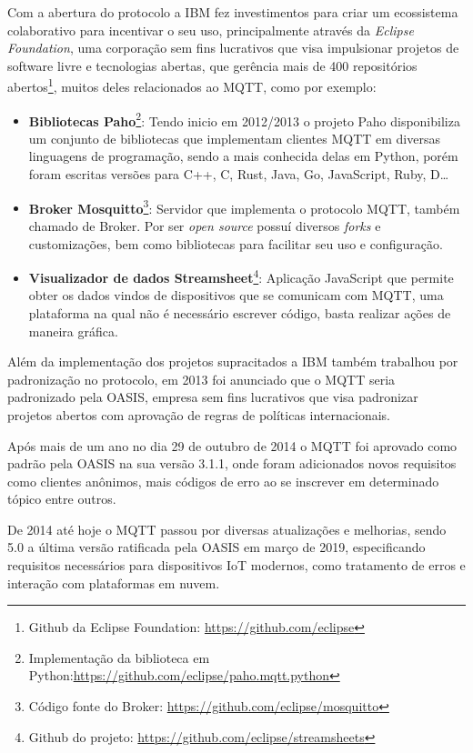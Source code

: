 \documentclass[12pt, a4paper]{article}
\begin{document}
Com a abertura do protocolo a IBM fez investimentos para criar um ecossistema colaborativo para incentivar o seu uso, principalmente através da \textit{Eclipse Foundation}, uma corporação sem fins lucrativos que visa impulsionar projetos de software livre e tecnologias abertas\cite{historia_eclipse_f}, que gerência mais de 400 repositórios abertos\footnote{Github da Eclipse Foundation: \url{https://github.com/eclipse}}, muitos deles relacionados ao MQTT, como por exemplo:

\begin{itemize}
    \item\textbf{Bibliotecas Paho}\footnote{Implementação da biblioteca em Python:\url{https://github.com/eclipse/paho.mqtt.python}}: Tendo inicio em 2012/2013 o projeto Paho disponibiliza um conjunto de bibliotecas que implementam clientes MQTT em diversas linguagens de programação, sendo a mais conhecida delas em Python, porém foram escritas versões para C++, C, Rust, Java, Go, JavaScript, Ruby, D\ldots
    \item\textbf{Broker Mosquitto}\footnote{Código fonte do Broker: \url{https://github.com/eclipse/mosquitto}}: Servidor que implementa o protocolo MQTT, também chamado de Broker. Por ser \textit{open source} possuí diversos \textit{forks} e customizações, bem como bibliotecas para facilitar seu uso e configuração.
    \item\textbf{Visualizador de dados Streamsheet}\footnote{Github do projeto: \url{https://github.com/eclipse/streamsheets}}: Aplicação JavaScript que permite obter os dados vindos de dispositivos que se comunicam com MQTT, uma plataforma na qual não é necessário escrever código, basta realizar ações de maneira gráfica.
\end{itemize}

Além da implementação dos projetos supracitados a IBM também trabalhou por padronização no protocolo, em 2013 foi anunciado que o MQTT seria padronizado pela OASIS\cite{historia_introduction_mqtt}, empresa sem fins lucrativos que visa padronizar projetos abertos com aprovação de regras de políticas internacionais\cite{historia_oasis}.

Após mais de um ano no dia 29 de outubro de 2014 o MQTT foi aprovado como padrão pela OASIS na sua versão 3.1.1, onde foram adicionados novos requisitos como clientes anônimos, mais códigos de erro ao se inscrever em determinado tópico entre outros.

De 2014 até hoje o MQTT passou por diversas atualizações e melhorias, sendo 5.0 a última versão ratificada pela OASIS em março de 2019\cite{historia_introduction_mqtt}, especificando requisitos necessários para dispositivos IoT modernos, como tratamento de erros e interação com plataformas em nuvem\cite{historia_introduction_mqtt}.
\end{document}
